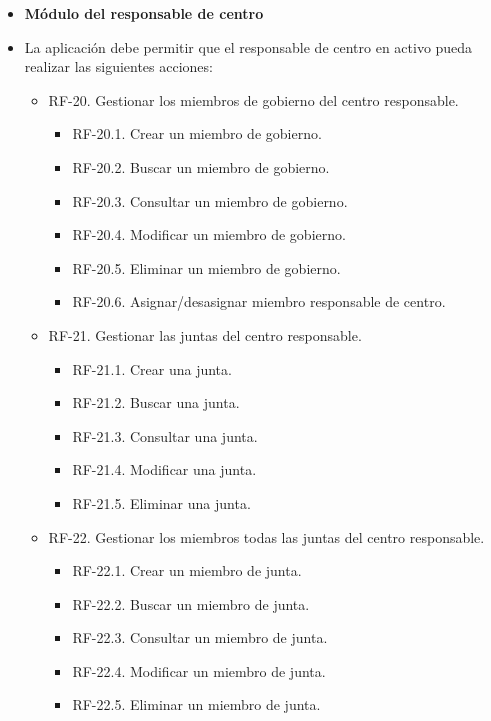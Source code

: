 \begin{itemize}
\item \textbf{Módulo del responsable de centro}
 \item[] La aplicación debe permitir que el responsable de centro en activo pueda realizar las siguientes acciones:
     \begin{itemize}
         \item RF-20. Gestionar los miembros de gobierno del centro responsable.
             \begin{itemize}
                  \item RF-20.1. Crear un miembro de gobierno.
                  \item RF-20.2. Buscar un miembro de gobierno.
                  \item RF-20.3. Consultar un miembro de gobierno.
                  \item RF-20.4. Modificar un miembro de gobierno.
                  \item RF-20.5. Eliminar un miembro de gobierno.
                 \item RF-20.6. Asignar/desasignar miembro responsable de centro.
             \end{itemize} 
        \item RF-21. Gestionar las juntas del centro responsable.
             \begin{itemize}
                  \item RF-21.1. Crear una junta.
                  \item RF-21.2. Buscar una junta.
                  \item RF-21.3. Consultar una junta.
                  \item RF-21.4. Modificar una junta.
                  \item RF-21.5. Eliminar una junta.
             \end{itemize} 
        \item RF-22. Gestionar los miembros todas las juntas del centro responsable.
             \begin{itemize}
                  \item RF-22.1. Crear un miembro de junta.
                  \item RF-22.2. Buscar un miembro de junta.
                  \item RF-22.3. Consultar un miembro de junta.
                  \item RF-22.4. Modificar un miembro de junta.
                  \item RF-22.5. Eliminar un miembro de junta.

\end{itemize}
\end{itemize}
\end{itemize}
